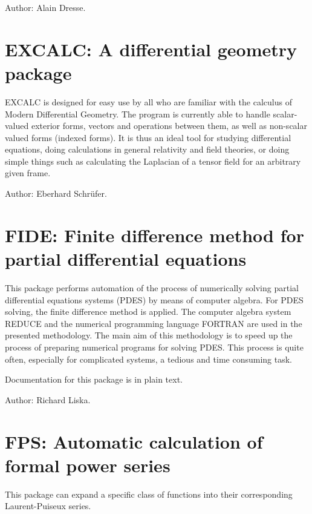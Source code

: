 Author: Alain Dresse.



\newpage

\section{EXCALC: A differential geometry package} 

EXCALC is designed for easy use by all who are familiar with the calculus
of Modern Differential Geometry. The program is currently able to handle
scalar-valued exterior forms, vectors and operations between them, as well
as non-scalar valued forms (indexed forms). It is thus an ideal tool for
studying differential equations, doing calculations in general relativity
and field theories, or doing simple things such as calculating the
Laplacian of a tensor field for an arbitrary given frame.

Author: Eberhard Schr\"ufer.



\newpage

\section{FIDE: Finite difference method for partial differential equations}

This package performs  automation of  the process of numerically
solving  partial  differential  equations  systems  (PDES)  by  means of
computer algebra.  For PDES solving, the finite difference method is applied.
The  computer  algebra  system  REDUCE  and  the  numerical  programming
language FORTRAN  are used in the presented methodology. The main aim of
this methodology is to speed up the process of preparing numerical
programs for  solving PDES.  This process is quite often, especially for
complicated systems, a tedious and time consuming task.

Documentation for this package is in plain text.

Author: Richard Liska.



\newpage

\section{FPS: Automatic calculation of formal power series}

This package can expand a specific class of functions into their
corresponding Laurent-Puiseux series.

